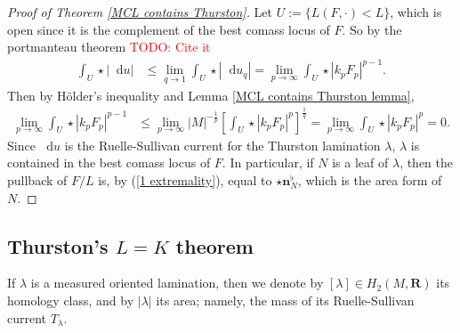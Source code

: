 \documentclass[reqno,11pt]{amsart}
\newcommand{\RR}{\mathbf{R}}
\newcommand*\dif{\mathop{}\!\mathrm{d}}
\newcommand{\normal}{\mathbf n}
\theoremstyle{definition}
\numberwithin{equation}{section}
\newcommand\todo[1]{\textcolor{red}{TODO: #1}}
\begin{document}
\begin{proof}[Proof of Theorem \ref{MCL contains Thurston}]
Let $U := \{L(F, \cdot) < L\}$, which is open since it is the complement of the best comass locus of $F$.
So by the portmanteau theorem \todo{Cite it}
\begin{align*}
\int_U \star |\dif u|
&\leq \lim_{q \to 1} \int_U \star |\dif u_q|
= \lim_{p \to \infty} \int_U \star |k_p F_p|^{p - 1}.
\end{align*}
Then by H\"older's inequality and Lemma \ref{MCL contains Thurston lemma},
\begin{align*}
\lim_{p \to \infty} \int_U \star |k_p F_p|^{p - 1}
&\leq \lim_{p \to \infty} |M|^{-\frac{1}{p}} \left[\int_U \star |k_p F_p|^p\right]^{\frac{1}{q}} 
= \lim_{p \to \infty} \int_U \star |k_p F_p|^p = 0.
\end{align*}
Since $\dif u$ is the Ruelle-Sullivan current for the Thurston lamination $\lambda$, $\lambda$ is contained in the best comass locus of $F$. 
In particular, if $N$ is a leaf of $\lambda$, then the pullback of $F/L$ is, by (\ref{1 extremality}), equal to $\star \normal_N^\flat$, which is the area form of $N$.
\end{proof}



\subsection{Thurston's \texorpdfstring{$L = K$}{L equals K} theorem}
If $\lambda$ is a measured oriented lamination, then we denote by $[\lambda] \in H_2(M, \RR)$ its homology class, and by $|\lambda|$ its area; namely, the mass of its Ruelle-Sullivan current $T_\lambda$.
\end{document}
